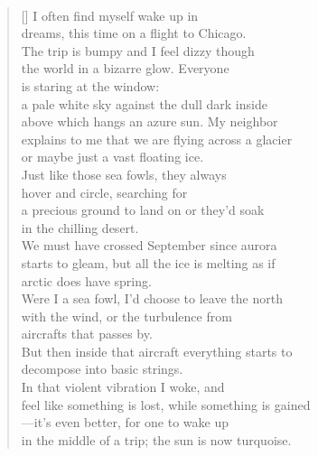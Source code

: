 \documentclass{book}
\begin{document}
\newpage
\poemtitle{\textcolor[RGB]{165,15,15}{Woke}}
\hspace*{\fill} \\
\settowidth{\versewidth}{feel like something is lost, while something is gained}
\begin{verse}[\versewidth]
    I often find myself wake up in \\
    dreams, this time on a flight to Chicago. \\
    The trip is bumpy and I feel dizzy though \\
    the world in a bizarre glow. Everyone \\
    is staring at the window: \\
    a pale white sky against the dull dark inside \\
    above which hangs an azure sun. My neighbor \\
    explains to me that we are flying across a glacier \\
    or maybe just a vast floating ice. \\
    Just like those sea fowls, they always \\
    hover and circle, searching for \\
    a precious ground to land on or they'd soak \\
    in the chilling desert. \\
    We must have crossed September since aurora \\
    starts to gleam, but all the ice is melting as if \\
    arctic does have spring. \\
    Were I a sea fowl, I'd choose to leave the north \\
    with the wind, or the turbulence from \\
    aircrafts that passes by. \\
    But then inside that aircraft everything starts to \\
    decompose into basic strings. \\
    In that violent vibration I woke, and \\
    feel like something is lost, while something is gained \\
    ---it's even better, for one to wake up \\
    in the middle of a trip; the sun is now turquoise. \\
\end{verse}
\end{document}
